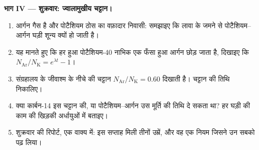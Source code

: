 \begin{problem}
\medskip
\noindent\textbf{भाग IV --- शुक्रवार: ज्वालामुखीय चट्टान।}
\begin{enumerate}[resume]
  \item आर्गन गैस है और पोटैशियम ठोस का वफ़ादार निवासी: समझाइए कि लावा के जमने
        से पोटैशियम--आर्गन घड़ी शून्य क्यों हो जाती है।
  \item यह मानते हुए कि हर  हुआ पोटैशियम-40 नाभिक एक फँसा हुआ
        आर्गन  छोड़ जाता है, दिखाइए कि $N_{\mathrm{Ar}}/N_{\mathrm K} = e^{\lambda t} - 1$।
  \item संग्रहालय के जीवाश्म के नीचे की चट्टान $N_{\mathrm{Ar}}/N_{\mathrm K} = 0.60$ दिखाती है। चट्टान की
        तिथि निकालिए।
  \item क्या कार्बन-14 इस चट्टान की, या पोटैशियम--आर्गन उस मूर्ति की तिथि दे
        सकता था? हर घड़ी की काम की खिड़की अर्धायुओं में बताइए।
  \item शुक्रवार की रिपोर्ट, एक वाक्य में: इस सप्ताह मिली तीनों उम्रें, और वह
        एक नियम जिसने उन सबको पढ़ लिया।
\end{enumerate}
\end{problem}
